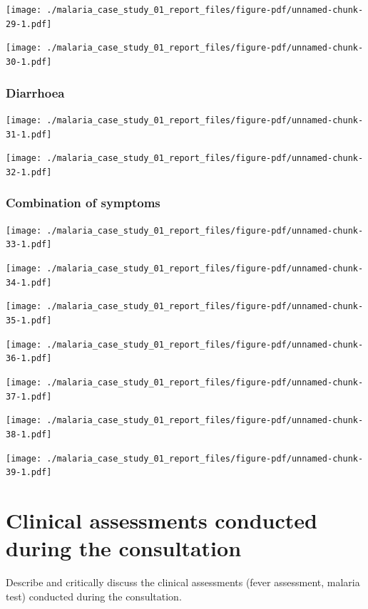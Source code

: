 \documentclass[
  letterpaper,
  DIV=11,
  numbers=noendperiod,
  oneside]{scrreprt}
\begin{document}
\texttt{[image: ./malaria\_case\_study\_01\_report\_files/figure-pdf/unnamed-chunk-29-1.pdf]}

\texttt{[image: ./malaria\_case\_study\_01\_report\_files/figure-pdf/unnamed-chunk-30-1.pdf]}

\hypertarget{diarrhoea}{%
\subsubsection{Diarrhoea}\label{diarrhoea}}

\texttt{[image: ./malaria\_case\_study\_01\_report\_files/figure-pdf/unnamed-chunk-31-1.pdf]}

\texttt{[image: ./malaria\_case\_study\_01\_report\_files/figure-pdf/unnamed-chunk-32-1.pdf]}

\hypertarget{combination-of-symptoms}{%
\subsubsection{Combination of symptoms}\label{combination-of-symptoms}}

\texttt{[image: ./malaria\_case\_study\_01\_report\_files/figure-pdf/unnamed-chunk-33-1.pdf]}

\texttt{[image: ./malaria\_case\_study\_01\_report\_files/figure-pdf/unnamed-chunk-34-1.pdf]}

\texttt{[image: ./malaria\_case\_study\_01\_report\_files/figure-pdf/unnamed-chunk-35-1.pdf]}

\texttt{[image: ./malaria\_case\_study\_01\_report\_files/figure-pdf/unnamed-chunk-36-1.pdf]}

\texttt{[image: ./malaria\_case\_study\_01\_report\_files/figure-pdf/unnamed-chunk-37-1.pdf]}

\texttt{[image: ./malaria\_case\_study\_01\_report\_files/figure-pdf/unnamed-chunk-38-1.pdf]}

\texttt{[image: ./malaria\_case\_study\_01\_report\_files/figure-pdf/unnamed-chunk-39-1.pdf]}

\hypertarget{clinical-assessments-conducted-during-the-consultation}{%
\section{Clinical assessments conducted during the
consultation}\label{clinical-assessments-conducted-during-the-consultation}}

Describe and critically discuss the clinical assessments (fever
assessment, malaria test) conducted during the consultation.
\end{document}
